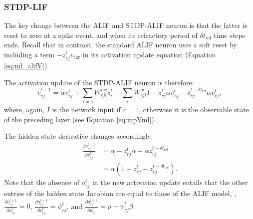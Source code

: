 		\subsubsection{STDP-LIF}
			The key change between the ALIF and STDP-ALIF neuron is that the latter is reset to zero at a spike event, and when its refractory period of $\delta t_\text{ref}$ time steps ends.
			Recall that in contrast, the standard ALIF neuron uses a soft reset by including a term $-z^t_{rj}v_\text{thr}$ in its activation update equation (Equation \ref{eq:ml_alifV}).

			The activation update of the STDP-ALIF neuron is therefore:
			\begin{equation}\label{eq:ml_stdpalifV}
	        v^{t+1}_{rj} = \alpha v_{rj}^t + \sum_{i\neq j}W^\text{rec}_{rji}z_i^t + \sum_i W^\text{in}_{rji}I -z^t_{rj}\alpha v^t_{rj} - z_{rj}^{t-\delta t_\text{ref}}\alpha v^t_{rj},
	        \end{equation}
	        where, again, $I$ is the network input if $r=1$, otherwise it is the observable state of the preceding layer (see Equation \ref{eq:inpVml}).

	        The hidden state derivative changes accordingly:
	        \begin{align}
	        \frac{\partial v_{rj}^{t+1}}{\partial v^t_{rj}} &= \alpha - z^t_{rj}\alpha - \alpha z_{rj}^{t-\delta t_\text{ref}}\\
	        &= \alpha\left(1 - z^t_{rj} - z_{rj}^{t-\delta t_\text{ref}}\right).
	        \end{align}
	        Note that the absence of $a^t_{rj}$ in the new activation update entails that the other entries of the hidden state Jacobian are equal to those of the ALIF model, \ie, $\frac{\partial v^{t+1}_{rj}}{\partial a^t_{rj}}=0$, $\frac{\partial a^{t+1}_{rj}}{\partial v^t_{rj}}=\psi^t_{rj}$, and $\frac{\partial a^{t+1}_{rj}}{\partial a^t_{rj}} = \rho - \psi^t_{rj}\beta$.


